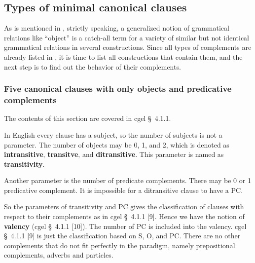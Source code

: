 \documentclass{article}
\newcommand*{\citesec}[1]{\S~{#1}}
\newcommand*{\concept}[1]{\textbf{#1}}
\begin{document}
\subsection{Types of minimal canonical clauses}\label{sec:minimal-canonical-clause}

As is mentioned in ,
strictly speaking, 
a generalized notion of grammatical relations like ``object'' 
is a catch-all term for a variety of similar but not identical grammatical relations 
in several constructions.
Since all types of complements are already listed in ,
it is time to list all constructions that contain them, 
and the next step is to find out the behavior of their complements.

\subsubsection{Five canonical clauses with only objects and predicative complements}

The contents of this section are covered in \ac{cgel} \citesec{4.1.1}.


In English every clause has a subject, so the number of subjects is not a parameter.
The number of objects may be 0, 1, and 2,
which is denoted as \concept{intransitive}, \concept{transitve}, and \concept{ditransitive}.
This parameter is named as \concept{transitivity}.


Another parameter is the number of predicate complements.
There may be 0 or 1 predicative complement.
It is impossible for a ditransitive clause to have a PC.

So the parameters of transitivity and PC gives the classification 
of clauses with respect to their complements 
as in \ac{cgel} \citesec{4.1.1} [9].
Hence we have the notion of \concept{valency} (\ac{cgel} \citesec{4.1.1} [10]). 
The number of PC is included into the valency.
\ac{cgel} \citesec{4.1.1} [9] is just the classification based on S, O, and PC.
There are no other complements that do not fit perfectly in the paradigm,
namely prepositional complements, adverbs and particles.
\end{document}
